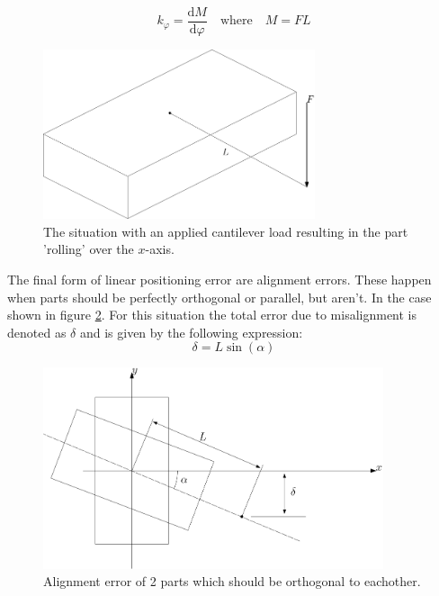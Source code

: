 \documentclass[11pt, a4paper]{article}
\renewcommand*{\phi}{\varphi}
\renewcommand*{\d}{\text{d}}
\numberwithin{equation}{section}
\numberwithin{figure}{section}
\begin{document}
\begin{equation}
  k_\phi = \frac{\d M}{\d\phi} \quad\text{where}\quad M=FL
\end{equation}
\begin{figure}[h]
  \centerline{\includegraphics[width=80mm]{images/Moment.png}}
  \caption{The situation with an applied cantilever load resulting in the part 'rolling' over the $x$-axis.}
  \label{fig:cantilever_load}
\end{figure}
The final form of linear positioning error are alignment errors. These happen when parts should be perfectly orthogonal or parallel, but aren't. In the case shown in figure \ref{fig:alignment}. For this situation the total error due to misalignment is denoted as $\delta$ and is given by the following expression:
\begin{equation}
  \delta = L \sin(\alpha)
\end{equation}
\begin{figure}[h]
  \centerline{\includegraphics[width=100mm]{images/misalignment.png}}
  \caption{Alignment error of 2 parts which should be orthogonal to eachother.}
  \label{fig:alignment}
\end{figure}
\end{document}

